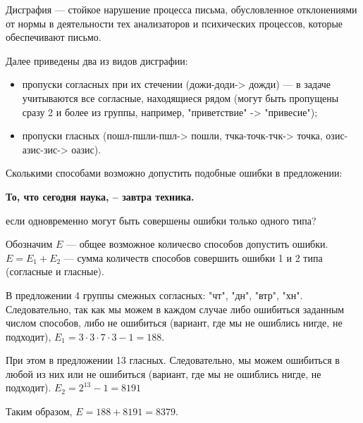 
Дисграфия — стойкое нарушение процесса письма, обусловленное отклонениями от нормы в деятельности тех анализаторов и психических процессов, которые обеспечивают письмо. 

Далее приведены два из видов дисграфии:

\begin{itemize}
    \item пропуски согласных при их стечении (дожи-доди-> дожди) — в задаче учитываются все согласные, находящиеся рядом (могут быть пропущены сразу 2 и более из группы, например, "приветствие" -> "привесие");
    \item пропуски гласных (пошл-пшли-пшл-> пошли, тчка-точк-тчк-> точка, озис-азис-зис-> оазис).
\end{itemize}

Сколькими способами возможно допустить подобные ошибки в предложении:

\begin{center}
    \textbf{То, что сегодня наука, – завтра техника.}
\end{center}

если одновременно могут быть совершены ошибки только одного типа?

\solutionSection

Обозначим $E$ — общее возможное количесво способов допустить ошибки.
$E = E_1 + E_2$ — сумма количеств способов совершить ошибки 1 и 2 типа (согласные и гласные).

В предложении 4 группы смежных согласных: "чт"{}, "дн"{}, "втр"{}, "хн"{}. Следовательно, так как мы можем в каждом случае либо ошибиться заданным числом способов, либо не ошибиться (вариант, где мы не ошиблись нигде, не подходит), $E_1 = 3\cdot 3\cdot 7 \cdot 3 - 1 = 188$.

При этом в предложении 13 гласных. Следовательно, мы можем ошибиться в любой из них или не ошибиться (вариант, где мы не ошиблись нигде, не подходит). $E_2 = 2^{13} - 1 = 8191$

Таким образом, $E = 188 + 8191 = 8379$.


